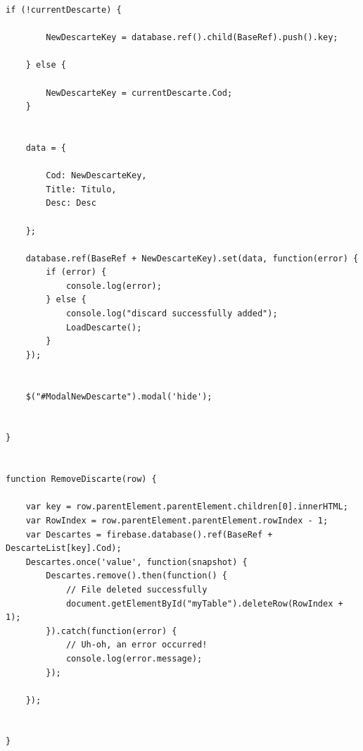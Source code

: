 \documentclass[
	12pt,				%
	openright,			%
	twoside,			%
	a4paper,			%
	english,			%
	french,				%
	spanish,			%
	brazil				%
	]{abntex2}
\begin{document}
\begin{apendicesenv}
\begin{lstlisting}[numbers=none,
basicstyle=\small,
caption={Discard.js},
title={Discard.js},
label={Discard.js}]
	if (!currentDescarte) {
		
		NewDescarteKey = database.ref().child(BaseRef).push().key;
		
	} else {
		
		NewDescarteKey = currentDescarte.Cod;
	}
	
	
	data = {
		
		Cod: NewDescarteKey,
		Title: Titulo,
		Desc: Desc
		
	};
	
	database.ref(BaseRef + NewDescarteKey).set(data, function(error) {
		if (error) {
			console.log(error);
		} else {
			console.log("discard successfully added");
			LoadDescarte();
		}
	});
	
	
	$("#ModalNewDescarte").modal('hide');
	
	
}


function RemoveDiscarte(row) {
	
	var key = row.parentElement.parentElement.children[0].innerHTML;
	var RowIndex = row.parentElement.parentElement.rowIndex - 1;
	var Descartes = firebase.database().ref(BaseRef + DescarteList[key].Cod);
	Descartes.once('value', function(snapshot) {
		Descartes.remove().then(function() {
			// File deleted successfully
			document.getElementById("myTable").deleteRow(RowIndex + 1);
		}).catch(function(error) {
			// Uh-oh, an error occurred!
			console.log(error.message);
		});
		
	});
	
	
}
\end{lstlisting}
\end{apendicesenv}



\printindex
\end{document}
